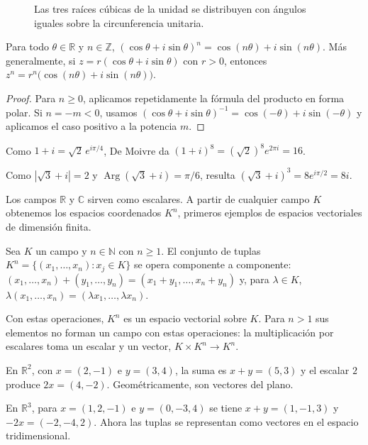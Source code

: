 \begin{figure}[htbp]
  \centering
  
  \caption{Las tres raíces cúbicas de la unidad se distribuyen con ángulos iguales sobre la circunferencia unitaria.}
  \label{fig:raices-unidad}
\end{figure}
\begin{theorem}
Para todo $\theta\in\mathbb{R}$ y $n\in\mathbb{Z}$,
$(\cos\theta+i\sin\theta)^n=\cos(n\theta)+i\sin(n\theta)$.
Más generalmente, si $z=r(\cos\theta+i\sin\theta)$ con $r>0$, entonces
$z^n=r^n\bigl(\cos(n\theta)+i\sin(n\theta)\bigr)$.
\end{theorem}
\begin{proof}
Para $n\geq0$, aplicamos repetidamente la fórmula del producto en forma polar.
Si $n=-m<0$, usamos
$(\cos\theta+i\sin\theta)^{-1}=\cos(-\theta)+i\sin(-\theta)$ y aplicamos el
caso positivo a la potencia $m$.
\end{proof}
\begin{example}
Como $1+i=\sqrt2\,e^{i\pi/4}$, De Moivre da $(1+i)^8=(\sqrt2)^8e^{2\pi i}=16$.
\end{example}
\begin{example}
Como $|\sqrt3+i|=2$ y $\operatorname{Arg}(\sqrt3+i)=\pi/6$, resulta
$(\sqrt3+i)^3=8e^{i\pi/2}=8i$.
\end{example}
Los campos $\mathbb{R}$ y $\mathbb{C}$ sirven como escalares. A partir de cualquier
campo $K$ obtenemos los espacios coordenados $K^n$, primeros ejemplos de espacios
vectoriales de dimensión finita.
\begin{definition}
Sea $K$ un campo y $n\in\mathbb{N}$ con $n\geq1$. El conjunto de tuplas
$K^n=\{(x_1,\ldots,x_n):x_j\in K\}$ se opera componente a componente:
$(x_1,\ldots,x_n)+(y_1,\ldots,y_n)=(x_1+y_1,\ldots,x_n+y_n)$ y, para
$\lambda\in K$, $\lambda(x_1,\ldots,x_n)=(\lambda x_1,\ldots,\lambda x_n)$.
\end{definition}
Con estas operaciones, $K^n$ es un espacio vectorial sobre $K$. Para $n>1$ sus
elementos no forman un campo con estas operaciones: la multiplicación por
escalares toma un escalar y un vector, $K\times K^n\to K^n$.
\begin{example}
En $\mathbb{R}^2$, con $x=(2,-1)$ e $y=(3,4)$, la suma es $x+y=(5,3)$ y el
escalar $2$ produce $2x=(4,-2)$. Geométricamente, son vectores del plano.
\end{example}
\begin{example}
En $\mathbb{R}^3$, para $x=(1,2,-1)$ e $y=(0,-3,4)$ se tiene
$x+y=(1,-1,3)$ y $-2x=(-2,-4,2)$. Ahora las tuplas se representan como
vectores en el espacio tridimensional.
\end{example}
